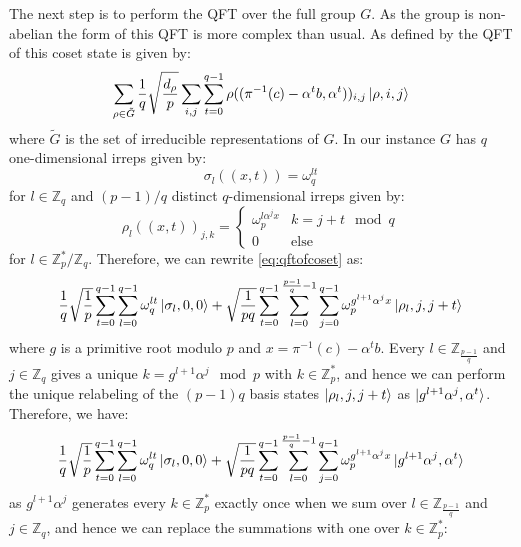 The next step is to perform the QFT over the full group $G$. As the group is non-abelian the form of this QFT is more complex than usual. As defined by \cite{hallgren2000normal} the QFT of this coset state is given by:
\begin{equation}
    \sum_{\rho \in \tilde G} \frac{1}{q}\sqrt{\frac{d_{\rho}}{p}}\sum_{i,j}\sum_{t=0}^{q-1} \rho((\pi^{-1}(c) - \alpha^tb,\alpha^t))_{i,j} \ket{\rho,i,j}
    \label{eq:qftofcoset}
\end{equation}
where $\tilde G$ is the set of irreducible representations of $G$. In our instance $G$ has $q$ one-dimensional irreps given by:
\begin{equation}
    \sigma_l((x,t)) = \omega^{lt}_q
\end{equation}
for $l \in \mathbb{Z}_q$ and $(p-1)/q$ distinct $q$-dimensional irreps given by:
\begin{equation}
    \rho_l((x,t))_{j,k} = \begin{cases}
        \omega_p^{l \alpha^j x} & k = j + t \mod q\\
        0 & \text{else}
    \end{cases}
\end{equation}
for $l \in \mathbb{Z}_p^*/\mathbb{Z}_q$. Therefore, we can rewrite \eqref{eq:qftofcoset} as:
\begin{equation}
     \frac{1}{q}\sqrt{\frac{1}{p}}\sum_{t=0}^{q-1}  \sum_{l=0}^{q-1}\omega^{lt}_q\ket{\sigma_l,0,0} +  \sqrt{\frac{1}{pq}}\sum_{t=0}^{q-1} \sum_{l =0}^{\frac{p-1}{q}-1}\sum_{j=0}^{q-1} \omega_p^{g^{l+1}\alpha^j x}\ket{\rho_l,j,j+t} 
\end{equation}
where $g$ is a primitive root modulo $p$ and $x = \pi^{-1}(c) - \alpha^tb$.  Every $l  \in \mathbb{Z}_{\frac{p-1}{q}}$ and $j  \in \mathbb{Z}_q$ gives a unique $k=g^{l+1}\alpha^j \mod p$ with $k \in \mathbb{Z}_p^*$, and hence we can perform the unique relabeling of the $(p-1)q$ basis states $\ket{\rho_l,j,j+t}$ as $\ket{g^{l+1}\alpha^j,\alpha^t}$. Therefore, we have:
\begin{equation}
     \frac{1}{q}\sqrt{\frac{1}{p}}\sum_{t=0}^{q-1}  \sum_{l=0}^{q-1}\omega^{lt}_q\ket{\sigma_l,0,0} +  \sqrt{\frac{1}{pq}}\sum_{t=0}^{q-1} \sum_{l =0}^{\frac{p-1}{q}-1}\sum_{j=0}^{q-1} \omega_p^{g^{l+1} \alpha^j x}\ket{g^{l+1}\alpha^j,\alpha^t}
\end{equation}
as $g^{l+1} \alpha^j$ generates every $k \in \mathbb{Z}_p^*$ exactly once when we sum over $l \in \mathbb{Z}_{\frac{p-1}{q}}$ and $j \in \mathbb{Z}_q$, and hence we can replace the summations with one over $k \in \mathbb{Z}_p^*$:
